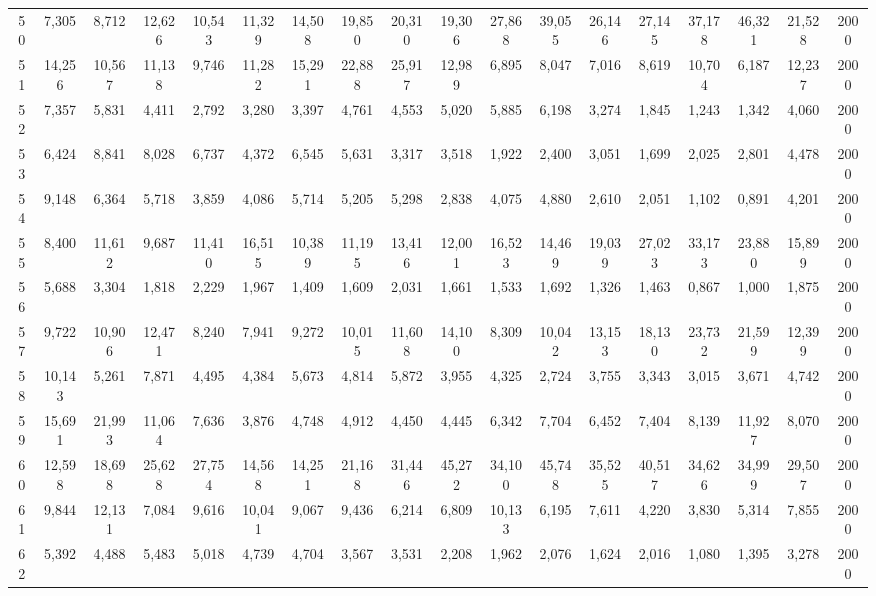 {\begin{longtable}{ >{\tiny}cccccccccccccccccc}
50  & 7,305  & 8,712  & 12,626 & 10,543 & 11,329 & 14,508 & 19,850 & 20,310 & 19,306 & 27,868 & 39,055 & 26,146 & 27,145  & 37,178  & 46,321  & 21,528 & 2000 \\
51  & 14,256 & 10,567 & 11,138 & 9,746  & 11,282 & 15,291 & 22,888 & 25,917 & 12,989 & 6,895  & 8,047  & 7,016  & 8,619   & 10,704  & 6,187   & 12,237 & 2000 \\
52  & 7,357  & 5,831  & 4,411  & 2,792  & 3,280  & 3,397  & 4,761  & 4,553  & 5,020  & 5,885  & 6,198  & 3,274  & 1,845   & 1,243   & 1,342   & 4,060  & 2000 \\
53  & 6,424  & 8,841  & 8,028  & 6,737  & 4,372  & 6,545  & 5,631  & 3,317  & 3,518  & 1,922  & 2,400  & 3,051  & 1,699   & 2,025   & 2,801   & 4,478  & 2000 \\
54  & 9,148  & 6,364  & 5,718  & 3,859  & 4,086  & 5,714  & 5,205  & 5,298  & 2,838  & 4,075  & 4,880  & 2,610  & 2,051   & 1,102   & 0,891   & 4,201  & 2000 \\
55  & 8,400  & 11,612 & 9,687  & 11,410 & 16,515 & 10,389 & 11,195 & 13,416 & 12,001 & 16,523 & 14,469 & 19,039 & 27,023  & 33,173  & 23,880  & 15,899 & 2000 \\
56  & 5,688  & 3,304  & 1,818  & 2,229  & 1,967  & 1,409  & 1,609  & 2,031  & 1,661  & 1,533  & 1,692  & 1,326  & 1,463   & 0,867   & 1,000   & 1,875  & 2000 \\
57  & 9,722  & 10,906 & 12,471 & 8,240  & 7,941  & 9,272  & 10,015 & 11,608 & 14,100 & 8,309  & 10,042 & 13,153 & 18,130  & 23,732  & 21,599  & 12,399 & 2000 \\
58  & 10,143 & 5,261  & 7,871  & 4,495  & 4,384  & 5,673  & 4,814  & 5,872  & 3,955  & 4,325  & 2,724  & 3,755  & 3,343   & 3,015   & 3,671   & 4,742  & 2000 \\
59  & 15,691 & 21,993 & 11,064 & 7,636  & 3,876  & 4,748  & 4,912  & 4,450  & 4,445  & 6,342  & 7,704  & 6,452  & 7,404   & 8,139   & 11,927  & 8,070  & 2000 \\
60  & 12,598 & 18,698 & 25,628 & 27,754 & 14,568 & 14,251 & 21,168 & 31,446 & 45,272 & 34,100 & 45,748 & 35,525 & 40,517  & 34,626  & 34,999  & 29,507 & 2000 \\
61  & 9,844  & 12,131 & 7,084  & 9,616  & 10,041 & 9,067  & 9,436  & 6,214  & 6,809  & 10,133 & 6,195  & 7,611  & 4,220   & 3,830   & 5,314   & 7,855  & 2000 \\
62  & 5,392  & 4,488  & 5,483  & 5,018  & 4,739  & 4,704  & 3,567  & 3,531  & 2,208  & 1,962  & 2,076  & 1,624  & 2,016   & 1,080   & 1,395   & 3,278  & 2000 \\

\end{longtable}}
